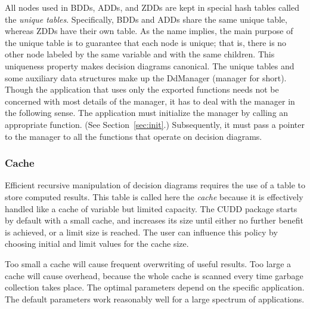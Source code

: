 \documentclass[11pt]{article}
\begin{document}
All nodes used in BDDs, ADDs, and ZDDs are kept in special
hash tables called the
\emph{unique tables}.  Specifically, BDDs and ADDs
share the same unique table, whereas ZDDs have their own table.  As
the name implies, the main purpose of the unique table is to guarantee
that each node is unique; that is, there is no other node labeled by
the same variable and with the same children.  This uniqueness
property makes decision diagrams canonical.  The
unique tables and some auxiliary data structures
make up the DdManager (manager for
short).  Though the application that uses only the exported functions
needs not be concerned with most details of the manager, it has to
deal with the manager in the following sense. The application must
initialize the manager by calling an appropriate function.  (See
Section~\ref{sec:init}.)  Subsequently, it must pass a pointer to the
manager to all the functions that operate on decision diagrams.


\subsubsection{Cache}
\label{sec:memoize}

Efficient recursive manipulation of decision diagrams requires the use
of a table to store computed results. This table
is called here the \emph{cache} because it is
effectively handled like a cache of variable but limited capacity. The
CUDD package starts by default with a small cache, and increases its
size until either no further benefit is achieved, or a limit size is
reached. The user can influence this policy by choosing initial and
limit values for the cache size.

Too small a cache will cause frequent overwriting of useful results.
Too large a cache will cause overhead, because the whole cache is
scanned every time garbage collection takes
place. The optimal parameters depend on the specific application. The
default parameters work reasonably well for a large spectrum of
applications.
\end{document}
